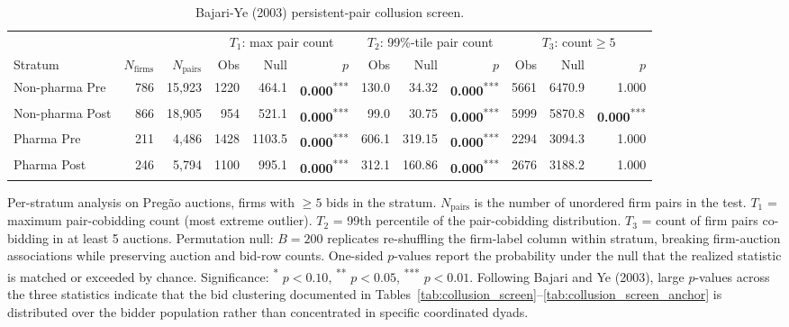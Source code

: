 \begin{table}[!htbp]
\centering
\begin{threeparttable}
\caption{Bajari-Ye (2003) persistent-pair collusion screen.}
\label{tab:collusion_screen_bajariye}
\footnotesize
\setlength{\tabcolsep}{4pt}
\providecommand{\sym}[1]{\textsuperscript{#1}}
\begin{tabular}{lrrrrrrrrrrr}
\toprule
 & & & \multicolumn{3}{c}{$T_1$: max pair count} & \multicolumn{3}{c}{$T_2$: 99\%-tile pair count} & \multicolumn{3}{c}{$T_3$: count$\geq 5$} \\
\cmidrule(lr){4-6}\cmidrule(lr){7-9}\cmidrule(lr){10-12}
Stratum & $N_{\mathrm{firms}}$ & $N_{\mathrm{pairs}}$ & Obs & Null & $p$ & Obs & Null & $p$ & Obs & Null & $p$ \\
\midrule
Non-pharma Pre & 786 & 15,923 & 1220 & 464.1 & \textbf{0.000}\sym{***} & 130.0 & 34.32 & \textbf{0.000}\sym{***} & 5661 & 6470.9 & 1.000 \\
Non-pharma Post & 866 & 18,905 & 954 & 521.1 & \textbf{0.000}\sym{***} & 99.0 & 30.75 & \textbf{0.000}\sym{***} & 5999 & 5870.8 & \textbf{0.000}\sym{***} \\
Pharma Pre & 211 & 4,486 & 1428 & 1103.5 & \textbf{0.000}\sym{***} & 606.1 & 319.15 & \textbf{0.000}\sym{***} & 2294 & 3094.3 & 1.000 \\
Pharma Post & 246 & 5,794 & 1100 & 995.1 & \textbf{0.000}\sym{***} & 312.1 & 160.86 & \textbf{0.000}\sym{***} & 2676 & 3188.2 & 1.000 \\
\bottomrule
\end{tabular}
\begin{tablenotes}[flushleft]\footnotesize
\item Per-stratum analysis on Preg\~ao auctions, firms with $\geq 5$ bids in the stratum. $N_{\mathrm{pairs}}$ is the number of unordered firm pairs in the test. $T_1$ = maximum pair-cobidding count (most extreme outlier). $T_2$ = 99th percentile of the pair-cobidding distribution. $T_3$ = count of firm pairs co-bidding in at least 5 auctions. Permutation null: $B = 200$ replicates re-shuffling the firm-label column within stratum, breaking firm-auction associations while preserving auction and bid-row counts. One-sided $p$-values report the probability under the null that the realized statistic is matched or exceeded by chance. Significance: \sym{*} $p<0.10$, \sym{**} $p<0.05$, \sym{***} $p<0.01$. Following Bajari and Ye (2003), large $p$-values across the three statistics indicate that the bid clustering documented in Tables~\ref{tab:collusion_screen}--\ref{tab:collusion_screen_anchor} is distributed over the bidder population rather than concentrated in specific coordinated dyads.
\end{tablenotes}
\end{threeparttable}
\end{table}
